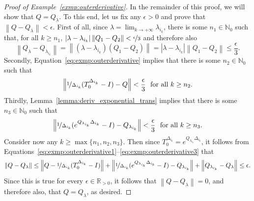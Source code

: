 \documentclass[10pt,a4paper]{paper}
\theoremstyle{definition}
\newcommand{\nats}{\mathbb{N}}
\newcommand{\reals}{\mathbb{R}}
\newcommand{\realspos}{\reals_{>0}}
\newcommand{\norm}[1]{\left\lVert #1 \right\rVert}
\newcommand{\abs}[1]{\left\vert #1 \right\vert}
\begin{document}
\begin{proof}[Proof of Example~\ref{exmp:outerderivative}]
In the remainder of this proof, we will show that $Q=Q_\lambda$. To this end, let us fix any $\epsilon>0$ and prove that $\norm{Q-Q_\lambda}<\epsilon$. First of all, since $\lambda=\lim_{k\to+\infty}\lambda_{i_k}$, there is some $n_1\in\nats_0$ such that, for all $k\geq n_1$, $\abs{\lambda-\lambda_{i_k}}\norm{Q_1-Q_2}<\nicefrac{\epsilon}{3}$ and therefore also
\begin{equation}\label{eq:exmp:outerderivative1}
\norm{Q_\lambda-Q_{\lambda_{i_k}}}
=\norm{(\lambda-\lambda_{i_k})(Q_1-Q_2)}
=\abs{\lambda-\lambda_{i_k}}\norm{Q_1-Q_2}\leq\frac{\epsilon}{3}.
\end{equation}
Secondly, Equation~\eqref{eq:exmp:outerderivative} implies that there is some $n_2\in\nats_0$ such that
\begin{equation}\label{eq:exmp:outerderivative2}
\norm{\nicefrac{1}{\Delta_{i_k}}(T_0^{\Delta_{i_k}}-I)-Q}<\frac{\epsilon}{3}
~\text{ for all $k\geq n_2$}.
\end{equation}
Thirdly, Lemma~\ref{lemma:deriv_exponential_trans} implies that there is some $n_3\in\nats_0$ such that
\begin{equation}\label{eq:exmp:outerderivative3}
\norm{\nicefrac{1}{\Delta_{i_k}}(e^{Q_{\lambda_{i_k}}\Delta_{i_k}}-I)-Q_{\lambda_{i_k}}} < \frac{\epsilon}{3}
~\text{ for all $k\geq n_3$.}
\end{equation}
Consider now any $k\geq\max\{n_1,n_2,n_3\}$. Then since $T_0^{\Delta_{i_k}}=e^{Q_{\lambda_{i_k}}\Delta_{i_k}}$, it follows from Equations~\eqref{eq:exmp:outerderivative1}--\eqref{eq:exmp:outerderivative3} that
\begin{align*}
\norm{Q - Q_{\lambda}} \leq 
\norm{Q-\nicefrac{1}{\Delta_{i_k}}(T_0^{\Delta_{i_k}}-I)}
+
\norm{\nicefrac{1}{\Delta_{i_k}}(e^{Q_{\lambda_{i_k}}\Delta_{i_k}}-I)-Q_{\lambda_{i_k}}}
+
\norm{Q_{\lambda_{i_k}}-Q_\lambda}
\leq\epsilon.
\end{align*}
Since this is true for every $\epsilon\in\realspos$, it follows that $\norm{Q-Q_{\lambda}}=0$, and therefore also, that $Q=Q_\lambda$, as desired.
\end{proof}
\end{document}
